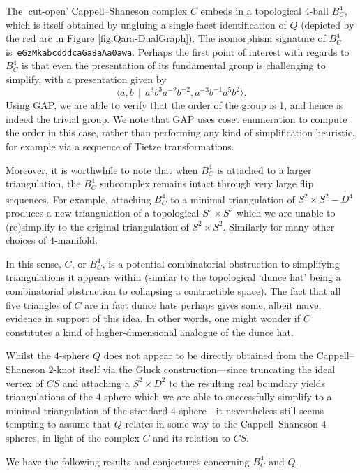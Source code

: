 \documentclass[pdflatex,sn-mathphys-num]{sn-jnl}
\theoremstyle{thmstyleone}%
\theoremstyle{thmstyletwo}%
\theoremstyle{thmstylethree}%
\theoremstyle{remark}
\begin{document}
The `cut-open' Cappell--Shaneson complex $C$ embeds in a topological $4$-ball $B^4_C$, which is itself obtained by ungluing a single facet identification of $Q$ (depicted by the red arc in Figure \ref{fig:Qara-DualGraph}). The isomorphism signature of $B^4_C$ is~\texttt{eGzMkabcdddcaGa8aAa0awa}.
Perhaps the first point of interest with regards to $B^4_C$ is that even the presentation of its fundamental group is challenging to simplify, with a presentation given by 
\[
    \langle a, b \,\mid\, a^3 b^3 a^{-2} b^{-2}, a^{-3} b^{-1} a^5 b^2 \rangle.
\]
Using GAP, we are able to verify that the order of the group is 1, and hence is indeed the trivial group. We note that GAP uses coset enumeration to compute the order in this case, rather than performing any kind of simplification heuristic, for example via a sequence of Tietze transformations. 

Moreover, it is worthwhile to note that when $B^4_C$ is attached to a larger triangulation, the $B^4_C$ subcomplex remains intact through very large flip sequences. For example, attaching $B^4_C$ to a minimal triangulation of $S^2\times S^2-\mathring{D^4}$ produces a new triangulation of a topological $S^2\times S^2$ which we are unable to (re)simplify to the original triangulation of $S^2\times S^2$. Similarly for many other choices of $4$-manifold.

In this sense, $C$, or $B^4_C$, is a potential combinatorial obstruction to simplifying triangulations it appears within (similar to the topological `dunce hat' being a combinatorial obstruction to collapsing a contractible space). The fact that all five triangles of $C$ are in fact dunce hats perhaps gives some, albeit naive, evidence in support of this idea. In other words, one might wonder if $C$ constitutes a kind of higher-dimensional analogue of the dunce hat.

Whilst the $4$-sphere $Q$ does not appear to be directly obtained from the Cappell--Shaneson $2$-knot itself via the Gluck construction---since truncating the ideal vertex of $CS$ and attaching a $S^2\times D^2$ to the resulting real boundary yields triangulations of the $4$-sphere which we are able to successfully simplify to a minimal triangulation of the standard $4$-sphere---it nevertheless still seems tempting to assume that $Q$ relates in some way to the Cappell--Shaneson $4$-spheres, in light of the complex $C$ and its relation to $CS$.

We have the following results and conjectures concerning $B^4_C$ and $Q$.
\end{document}
